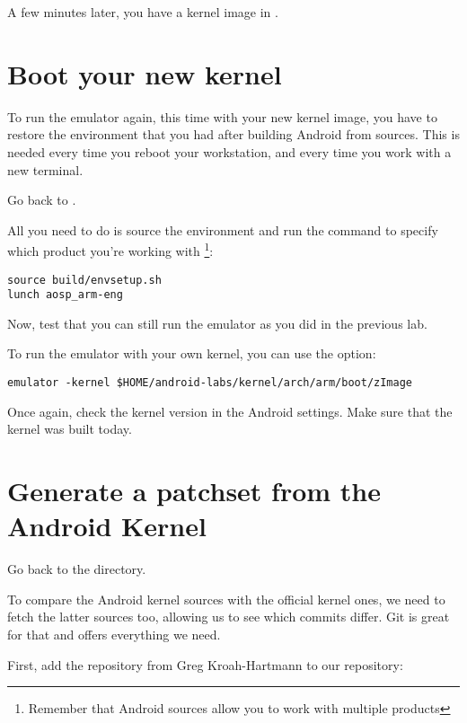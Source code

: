 
A few minutes later, you have a kernel image in .

\section{Boot your new kernel}

To run the emulator again, this time with your new kernel image, you
have to restore the environment that you had after building Android
from sources. This is needed every time you reboot your workstation,
and every time you work with a new terminal.

Go back to .

All you need to do is source the environment and run the 
command to specify which product you're working with
\footnote{Remember that Android sources allow you to work with
  multiple products}:

\begin{verbatim}
source build/envsetup.sh
lunch aosp_arm-eng
\end{verbatim}

Now, test that you can still run the emulator as you did in the
previous lab.

To run the emulator with your own kernel, you can use the
 option:

\begin{verbatim}
emulator -kernel $HOME/android-labs/kernel/arch/arm/boot/zImage
\end{verbatim}

Once again, check the kernel version in the Android settings. Make
sure that the kernel was built today.

\section{Generate a patchset from the Android Kernel}

Go back to the  directory.

To compare the Android kernel sources with the official kernel ones,
we need to fetch the latter sources too, allowing us to see which
commits differ. Git is great for that and offers everything we need.

First, add the  repository from Greg Kroah-Hartmann
to our repository:


